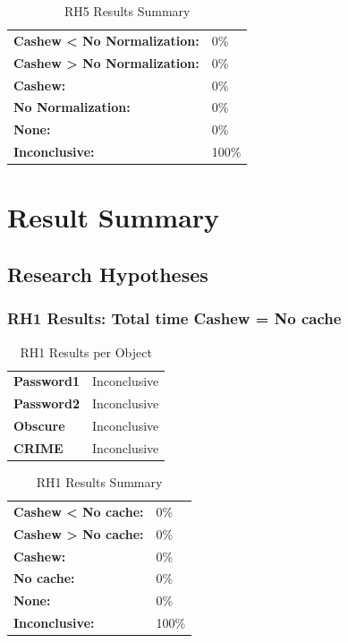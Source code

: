 \documentclass{article}\usepackage[]{graphicx}\usepackage[]{color}
\begin{document}
	\begin{table}[H]
	\centering
	\caption{RH5 Results Summary}
	\begin{tabular}{ll}
	\textbf{Cashew \textless{} No Normalization:}& 0\% \\
	\textbf{Cashew \textgreater{} No Normalization:}& 0\%\\
	\textbf{Cashew:} & 0\%\\
	\textbf{No Normalization:} & 0\%\\
	\textbf{None:}& 0\%\\
	\textbf{Inconclusive:}& 100\%
			
	
	\end{tabular}
	\end{table}
	
	
	



\section{Result Summary}
\subsection{Research Hypotheses}


	
	\subsubsection{RH1 Results: Total time Cashew = No cache}
	
	
	\begin{table}[H]
	\centering
	\caption{RH1 Results per Object}
	\begin{tabular}{ll}
	\textbf{Password1} & Inconclusive \\
	\textbf{Password2} & Inconclusive \\
	\textbf{Obscure} & Inconclusive \\
	\textbf{CRIME} & Inconclusive \\
	\end{tabular}
	\end{table}

	\begin{table}[H]
	\centering
	\caption{RH1 Results Summary}
	\begin{tabular}{ll}
	\textbf{Cashew \textless{} No cache:}& 0\% \\
	\textbf{Cashew \textgreater{} No cache:}& 0\%\\
	\textbf{Cashew:} & 0\%\\
	\textbf{No cache:} & 0\%\\
	\textbf{None:}& 0\%\\
	\textbf{Inconclusive:}& 100\%
			
	
	\end{tabular}
	\end{table}
	
\end{document}
